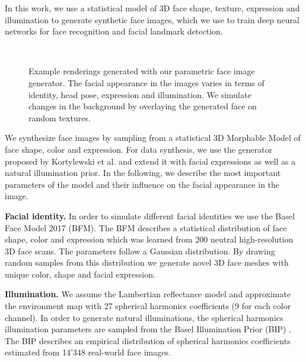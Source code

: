 \documentclass[10pt,twocolumn,letterpaper]{article}
\begin{document}
    In this work, we use a statistical model of 3D face shape, texture, expression and illumination to generate synthetic face images, which we use to train deep neural networks for face recognition and facial landmark detection.
	\begin{figure}
    	\centering
    	\\
    	\caption{Example renderings generated with our parametric face image generator. The facial appearance in the images varies in terms of identity, head pose, expression and illumination. We simulate changes in the background by overlaying the generated face on random textures.}
    	\label{fig:exampleSynth}
    \end{figure}%
	We synthesize face images by sampling from a statistical 3D Morphable Model \cite{blanz1999morphable} of face shape, color and expression. For data synthesis, we use the generator proposed by Kortylewski et al. \cite{kortylewski2017empirically} and extend it with facial expressions as well as a natural illumination prior. In the following, we describe the most important parameters of the model and their influence on the facial appearance in the image.
	
	\textbf{Facial identity.} In order to simulate different facial identities we use the Basel Face Model 2017 \cite{bfm17} (BFM). The BFM describes a statistical distribution of face shape, color and expression which was learned from 200 neutral high-resolution 3D face scans. The parameters follow a Gaussian distribution. By drawing random samples from this distribution we generate novel 3D face meshes with unique color, shape and facial expression.
	
	\textbf{Illumination.} We assume the Lambertian reflectance model and approximate the environment map with 27 spherical harmonics coefficients (9 for each color channel). In order to generate natural illuminations, the spherical harmonics illumination parameters are sampled  from the Basel Illumination Prior (BIP) \cite{illuprior}. The BIP describes an empirical distribution of spherical harmonics coefficients estimated from 14'348 real-world face images.
	
\end{document}
